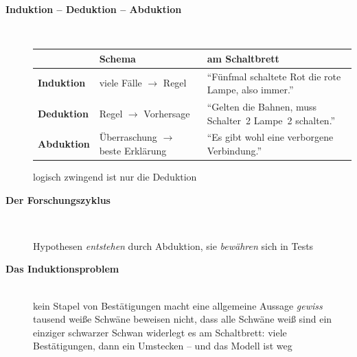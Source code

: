 \begin{description}
\item[{\rot\bf Induktion -- Deduktion -- Abduktion}]~\\[-\lblskip]
\begin{center}
\renewcommand{\arraystretch}{1.25}
\begin{tabular}{p{}p{}p{}}
\toprule
& \textbf{Schema} & \textbf{am Schaltbrett} \\
\midrule
\textbf{Induktion} & viele Fälle $\to$ Regel & \enquote{Fünfmal schaltete Rot die rote Lampe, also immer.} \\
\textbf{Deduktion} & Regel $\to$ Vorhersage & \enquote{Gelten die Bahnen, muss Schalter~2 Lampe~2 schalten.} \\
\textbf{Abduktion} & Überraschung $\to$ beste Erklärung & \enquote{Es gibt wohl eine verborgene Verbindung.} \\
\bottomrule
\end{tabular}
\end{center}
\bi
  \ite logisch zwingend ist nur die Deduktion
\ei
\os{\newpage}

\item[{\rot\bf Der Forschungszyklus}]~\\[-\lblskip]
\begin{center}
\end{center}
\bi
  \ite Hypothesen \emph{entstehen} durch Abduktion, sie \emph{bewähren}
    sich in Tests
\ei
\os{\newpage}

\item[{\rot\bf Das Induktionsproblem}]~\\[-\lblskip]
\bi
  \ite kein Stapel von Bestätigungen macht eine allgemeine Aussage
    \emph{gewiss}
  \ite tausend weiße Schwäne beweisen nicht, dass alle Schwäne weiß sind
  \ite ein einziger schwarzer Schwan widerlegt es
  \ite am Schaltbrett: viele Bestätigungen, dann ein Umstecken -- und
    das Modell ist weg
\ei
\os{\newpage}
\end{description}

